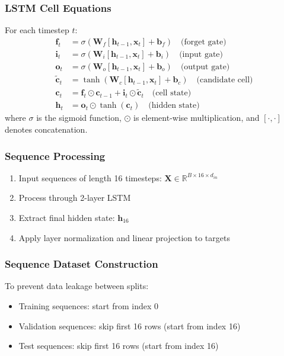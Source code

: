 \documentclass[12pt,a4paper]{article}
\begin{document}
\subsubsection{LSTM Cell Equations}
For each timestep $t$:
\begin{align}
    \mathbf{f}_t &= \sigma(\mathbf{W}_f [\mathbf{h}_{t-1}, \mathbf{x}_t] + \mathbf{b}_f) \quad \text{(forget gate)} \\
    \mathbf{i}_t &= \sigma(\mathbf{W}_i [\mathbf{h}_{t-1}, \mathbf{x}_t] + \mathbf{b}_i) \quad \text{(input gate)} \\
    \mathbf{o}_t &= \sigma(\mathbf{W}_o [\mathbf{h}_{t-1}, \mathbf{x}_t] + \mathbf{b}_o) \quad \text{(output gate)} \\
    \tilde{\mathbf{c}}_t &= \tanh(\mathbf{W}_c [\mathbf{h}_{t-1}, \mathbf{x}_t] + \mathbf{b}_c) \quad \text{(candidate cell)} \\
    \mathbf{c}_t &= \mathbf{f}_t \odot \mathbf{c}_{t-1} + \mathbf{i}_t \odot \tilde{\mathbf{c}}_t \quad \text{(cell state)} \\
    \mathbf{h}_t &= \mathbf{o}_t \odot \tanh(\mathbf{c}_t) \quad \text{(hidden state)}
\end{align}
where $\sigma$ is the sigmoid function, $\odot$ is element-wise multiplication, and $[\cdot, \cdot]$ denotes concatenation.

\subsubsection{Sequence Processing}
\begin{enumerate}
    \item Input sequences of length 16 timesteps: $\mathbf{X} \in \mathbb{R}^{B \times 16 \times d_{in}}$
    \item Process through 2-layer LSTM
    \item Extract final hidden state: $\mathbf{h}_{16}$
    \item Apply layer normalization and linear projection to targets
\end{enumerate}

\subsubsection{Sequence Dataset Construction}
To prevent data leakage between splits:
\begin{itemize}
    \item Training sequences: start from index 0
    \item Validation sequences: skip first 16 rows (start from index 16)
    \item Test sequences: skip first 16 rows (start from index 16)
\end{itemize}
\end{document}
